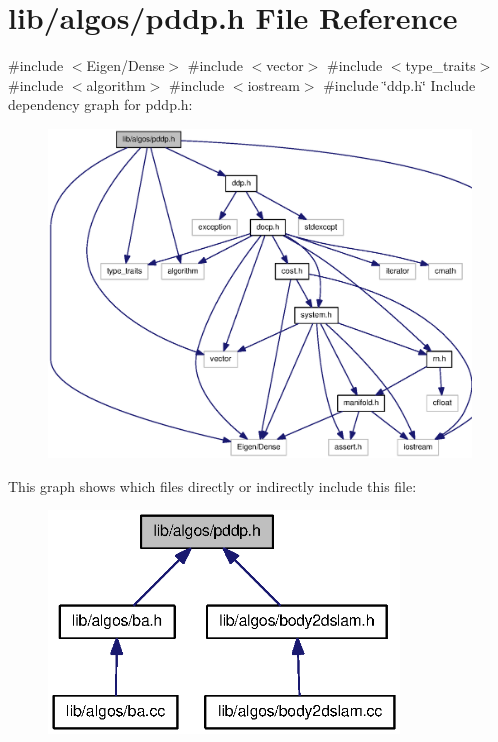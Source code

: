 \section{lib/algos/pddp.h \-File \-Reference}
\label{pddp_8h}
{\ttfamily \#include $<$\-Eigen/\-Dense$>$}\*
{\ttfamily \#include $<$vector$>$}\*
{\ttfamily \#include $<$type\-\_\-traits$>$}\*
{\ttfamily \#include $<$algorithm$>$}\*
{\ttfamily \#include $<$iostream$>$}\*
{\ttfamily \#include \char`\"{}ddp.\-h\char`\"{}}\*
\-Include dependency graph for pddp.\-h\-:\nopagebreak
\begin{figure}[H]
\begin{center}
\leavevmode
\includegraphics[width=350pt]{pddp_8h__incl}
\end{center}
\end{figure}
\-This graph shows which files directly or indirectly include this file\-:\nopagebreak
\begin{figure}[H]
\begin{center}
\leavevmode
\includegraphics[width=264pt]{pddp_8h__dep__incl}
\end{center}
\end{figure}
